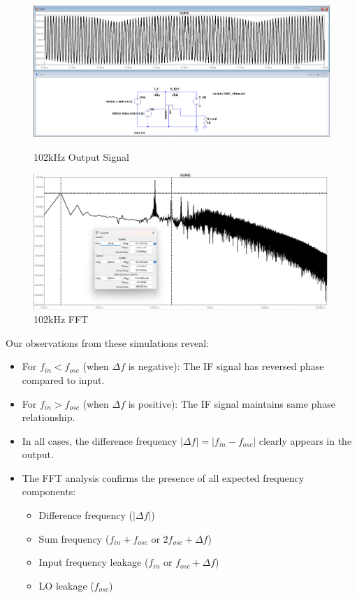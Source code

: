 \begin{figure}
    \centering
    \includegraphics[width=1\linewidth]{102.png}
    \caption{102kHz Output Signal}
    \includegraphics[width=1\linewidth]{fig/102fft.png}
    \caption{102kHz FFT}
\end{figure}
Our observations from these simulations reveal:

\begin{itemize}
    \item For $f_{in} < f_{osc}$ (when $\Delta f$ is negative): The IF signal has reversed phase compared to input.
    \item For $f_{in} > f_{osc}$ (when $\Delta f$ is positive): The IF signal maintains same phase relationship.
    \item In all cases, the difference frequency $|\Delta f| = |f_{in} - f_{osc}|$ clearly appears in the output.
    \item The FFT analysis confirms the presence of all expected frequency components:
        \begin{itemize}
            \item Difference frequency ($|\Delta f|$)
            \item Sum frequency ($f_{in} + f_{osc}$ or $2f_{osc} + \Delta f$)
            \item Input frequency leakage ($f_{in}$ or $f_{osc} + \Delta f$)
            \item LO leakage ($f_{osc}$)
        \end{itemize}
\end{itemize}
